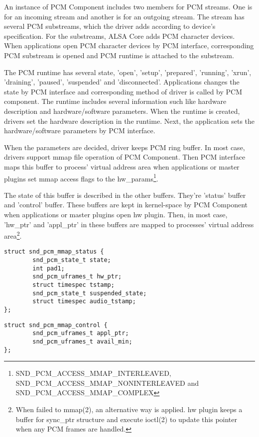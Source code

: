 \documentclass[onecolumn]{article}
\begin{document}
An instance of PCM Component includes two members for PCM streams. One is for an incoming stream and another is for an outgoing stream. The stream has several PCM substreams, which the driver adds according to device's specification. For the substreams, ALSA Core adds PCM character devices. When applications open PCM character devices by PCM interface, corresponding PCM substream is opened and PCM runtime is attached to the substream.

The PCM runtime has several state, 'open', 'setup', 'prepared', 'running', 'xrun', 'draining', 'paused', 'suspended' and 'disconnected'\cite{alsa-lib}. Applications changes the state by PCM interface and corresponding method of driver is called by PCM component. The runtime includes several information such like hardware description and hardware/software parameters. When the runtime is created, drivers set the hardware description in the runtime. Next, the application sets the hardware/software parameters by PCM interface.

When the parameters are decided, driver keeps PCM ring buffer. In most case, drivers support mmap file operation of PCM Component. Then PCM interface maps this buffer to process' virtual address area when applications or master plugins set mmap access flags to the hw\_params\footnote{SND\_PCM\_ACCESS\_MMAP\_INTERLEAVED, SND\_PCM\_ACCESS\_MMAP\_NONINTERLEAVED and SND\_PCM\_ACCESS\_MMAP\_COMPLEX}.

The state of this buffer is described in the other buffers. They're 'status' buffer and 'control' buffer. These buffers are kept in kernel-space by PCM Component when applications or master plugins open hw plugin. Then, in most case, 'hw\_ptr' and 'appl\_ptr' in these buffers are mapped to processes' virtual address area\footnote{When failed to mmap(2), an alternative way is applied. hw plugin keeps a buffer for sync\_ptr structure and execute ioctl(2) to update this pointer when any PCM frames are handled.}.

\begin{verbatim}
struct snd_pcm_mmap_status {
        snd_pcm_state_t state;
        int pad1;
        snd_pcm_uframes_t hw_ptr;
        struct timespec tstamp;
        snd_pcm_state_t suspended_state;
        struct timespec audio_tstamp;
};
\end{verbatim}

\begin{verbatim}
struct snd_pcm_mmap_control {
        snd_pcm_uframes_t appl_ptr;
        snd_pcm_uframes_t avail_min;
};
\end{verbatim}
\end{document}
